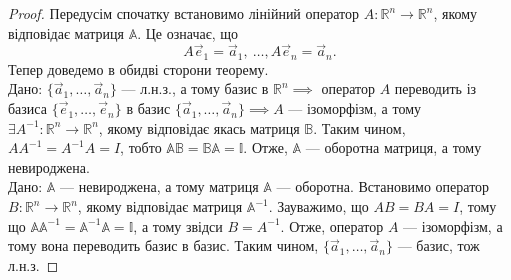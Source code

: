 \documentclass{math_library}
\begin{document}
\begin{proof}
Передусім спочатку встановимо лінійний оператор $A \colon \mathbb{R}^n \to \mathbb{R}^n$, якому відповідає матриця $\mathbb{A}$. Це означає, що 
\[
A\vec{e}_1 = \vec{a}_1,\ \dots, A\vec{e}_n = \vec{a}_n.
\]
Тепер доведемо в обидві сторони теорему.
\bigskip \\
\rightproof Дано: $\{\vec{a}_1,\dots,\vec{a}_n \}$ --- л.н.з., а тому базис в $\mathbb{R}^n \implies$ оператор $A$ переводить із базиса $\{\vec{e}_1,\dots,\vec{e}_n\}$ в базис $\{\vec{a}_1,\dots,\vec{a}_n\} \implies A$ --- ізоморфізм, а тому $\exists A^{-1} \colon \mathbb{R}^n \to \mathbb{R}^n$, якому відповідає якась матриця $\mathbb{B}$. Таким чином, $AA^{-1} = A^{-1}A = I$, тобто $\mathbb{A} \mathbb{B} = \mathbb{B} \mathbb{A} = \mathbb{I}$. Отже, $\mathbb{A}$ --- оборотна матриця, а тому невироджена.
\bigskip \\
\leftproof Дано: $\mathbb{A}$ --- невироджена, а тому матриця $\mathbb{A}$ --- оборотна. Встановимо оператор $B \colon \mathbb{R}^n \to \mathbb{R}^n$, якому відповідає матриця $\mathbb{A}^{-1}$. Зауважимо, що $AB = BA = I$, тому що $\mathbb{A} \mathbb{A}^{-1} = \mathbb{A}^{-1} \mathbb{A} = \mathbb{I}$, а тому звідси $B = A^{-1}$. Отже, оператор $A$ --- ізоморфізм, а тому вона переводить базис в базис. Таким чином, $\{\vec{a}_1,\dots,\vec{a}_n \}$ --- базис, тож л.н.з.
\end{proof}

\iffalse
\begin{proof}
$\{\vec{a}_1,\dots,\vec{a}_n\}$ - л.н.з. $\iff$ $\{\vec{a}_1,\dots,\vec{a}_n\}$ - базис в $\mathbb{R}^n \iff \mathbb{A} = (\vec{a}_1,\dots,\vec{a}_n)$ задає ізоморфізм \\ $A: \mathbb{R}^n \to \mathbb{R}^n$ із $\{\vec{e_1},\dots,\vec{e_n}\}$ в $\{\vec{a_1},\dots,\vec{a_n} \}$ $\iff$ має обернений $A^{-1} \iff \det \mathbb{A} \neq 0$.
\end{proof}
\fi
\end{document}
